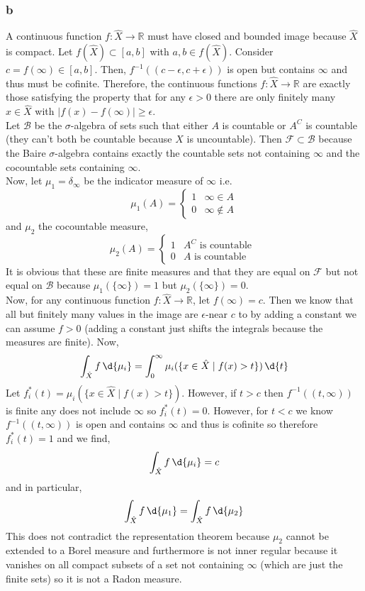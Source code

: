 \documentclass[12pt]{article}
\newcommand{\B}{\mathcal{B}}
\newcommand{\R}{\mathbb{R}}
\renewcommand{\F}{\mathcal{F}}
\begin{document}
\subsubsection{b} 

A continuous function $f : \hat{X} \to \R$ must have closed and bounded image because $\hat{X}$ is compact. Let $f(\hat{X}) \subset [a,b]$ with $a,b \in f(\hat{X})$. Consider $c = f(\infty) \in [a,b]$. Then, $f^{-1}((c - \epsilon, c + \epsilon))$ is open but contains $\infty$ and thus must be cofinite. Therefore, the continuous functions $f : \hat{X} \to \R$ are exactly those satisfying the property that for any $\epsilon > 0$ there are only finitely many $x \in \hat{X}$ with $|f(x) - f(\infty)| \ge \epsilon$.
\bigskip\\
Let $\B$ be the $\sigma$-algebra of sets such that either $A$ is countable or $A^C$ is countable (they can't both be countable because $X$ is uncountable). Then $\F \subset \B$ because the Baire $\sigma$-algebra contains exactly the countable sets not containing $\infty$ and the cocountable sets containing $\infty$.
\bigskip\\
Now, let $\mu_1 = \delta_\infty$ be the indicator measure of $\infty$ i.e.
\[ \mu_1(A) = 
\begin{cases}
1 & \infty \in A
\\
0 & \infty \notin A 
\end{cases} \]
and $\mu_2$ the cocountable measure,
\[ \mu_2(A) = 
\begin{cases}
1 & A^C \text{ is countable }
\\
0 & A \text{ is countable} 
\end{cases} \]
It is obvious that these are finite measures and that they are equal on $\F$ but not equal on $\B$ because $\mu_1(\{ \infty \}) = 1$ but $\mu_2(\{ \infty \}) = 0$.
\bigskip\\
Now, for any continuous function $f : \hat{X} \to \R$, let $f(\infty) = c$. Then we know that all but finitely many values in the image are $\epsilon$-near $c$ to by adding a constant we can assume $f > 0$ (adding a constant just shifts the integrals because the measures are finite). Now,
\[ \int_{\hat{X}} f \, \d{\mu_i} = \int_0^\infty \mu_i(\{ x \in \hat{X} \mid f(x) > t \}) \, \d{t} \]
Let $f^*_i(t) = \mu_i(\{ x \in \hat{X} \mid f(x) > t \})$.
However, if $t > c$ then $f^{-1}((t, \infty))$ is finite any does not include $\infty$ so $f^*_i(t) = 0$. However, for $t < c$ we know $f^{-1}((t, \infty))$ is open and contains $\infty$ and thus is cofinite so therefore $f^*_i(t) = 1$ and we find,
\[ \int_{\hat{X}} f \, \d{\mu_i} = c \]
and in particular,
\[ \int_{\hat{X}} f \, \d{\mu_1} = \int_{\hat{X}} f \, \d{\mu_2} \]
This does not contradict the representation theorem because $\mu_2$ cannot be extended to a Borel measure and furthermore is not inner regular because it vanishes on all compact subsets of a set not containing $\infty$ (which are just the finite sets) so it is not a Radon measure.
\end{document}
